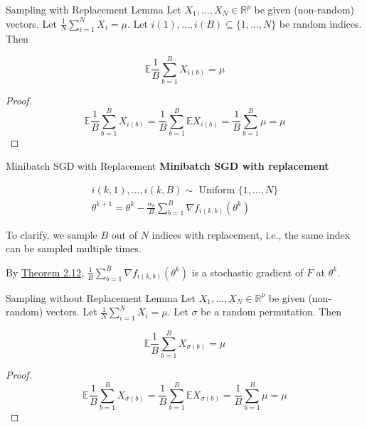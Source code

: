\begin{frame}[allowframebreaks]

\begin{mytheoremblock}{2.12}{Sampling with Replacement Lemma}
    Let $X_{1}, \ldots, X_{N} \in \mathbb{R}^{p}$ be given (non-random) vectors. Let $\frac{1}{N} \sum_{i=1}^{N} X_{i}=\mu$. Let $i(1), \ldots, i(B) \subseteq\{1, \ldots, N\}$ be random indices. Then

    $$
    \mathbb{E} \frac{1}{B} \sum_{b=1}^{B} X_{i(b)}=\mu
    $$

    \begin{proof}
        $$
        \mathbb{E} \frac{1}{B} \sum_{b=1}^{B} X_{i(b)}=\frac{1}{B} \sum_{b=1}^{B} \mathbb{E} X_{i(b)}=\frac{1}{B} \sum_{b=1}^{B} \mu=\mu
        $$
    \end{proof}
\end{mytheoremblock}

\end{frame}

\begin{frame}[allowframebreaks]

\begin{mydefinitionblock}{2.13}{Minibatch SGD with Replacement}
    \textbf{Minibatch SGD with replacement}

    $$
    \begin{gathered}
    i(k, 1), \ldots, i(k, B) \sim \text { Uniform }\{1, \ldots, N\} \\
    \theta^{k+1}=\theta^{k}-\frac{\alpha_{k}}{B} \sum_{b=1}^{B} \nabla f_{i(k, b)}\left(\theta^{k}\right)
    \end{gathered}
    $$

    To clarify, we sample $B$ out of $N$ indices with replacement, i.e., the same index can be sampled multiple times.

    By \hyperref[theorem:2.12]{Theorem 2.12}, $\frac{1}{B} \sum_{b=1}^{B} \nabla f_{i(k, b)}\left(\theta^{k}\right)$ is a stochastic gradient of $F$ at $\theta^{k}$.
\end{mydefinitionblock}

\end{frame}

\begin{frame}[allowframebreaks]

\begin{mytheoremblock}{2.14}{Sampling without Replacement Lemma}
    Let $X_{1}, \ldots, X_{N} \in \mathbb{R}^{p}$ be given (non-random) vectors. Let $\frac{1}{N} \sum_{i=1}^{N} X_{i}=\mu$. Let $\sigma$ be a random permutation. Then

    $$
    \mathbb{E} \frac{1}{B} \sum_{b=1}^{B} X_{\sigma(b)}=\mu
    $$

    \begin{proof}
        $$
        \mathbb{E} \frac{1}{B} \sum_{b=1}^{B} X_{\sigma(b)}=\frac{1}{B} \sum_{b=1}^{B} \mathbb{E} X_{\sigma(b)}=\frac{1}{B} \sum_{b=1}^{B} \mu=\mu
        $$
    \end{proof}
\end{mytheoremblock}

\end{frame}

